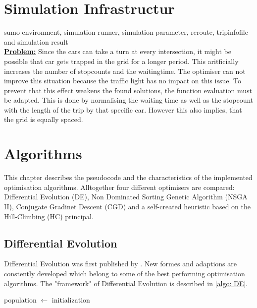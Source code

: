 \documentclass[./\jobname.tex]{subfiles}
\begin{document}
\newpage

\chapter{Simulation Infrastructur}
sumo environment, simulation runner, simulation parameter, reroute, tripinfofile and simulation result\\

\textbf{\underline{Problem:}} Since the cars can take a turn at every intersection, it might be possible that car gets trapped in the grid for a longer period. This aritficially increases the number of stopcounts and the waitingtime. The optimiser can not improve this situation because the traffic light has no impact on this issue. To prevent that this effect weakens the found solutions, the function evaluation must be adapted. This is done by normalising the waiting time as well as the stopcount with the length of the trip by that specific car. However this also implies, that the grid is equally spaced. 

\chapter{Algorithms}
This chapter describes the pseudocode and the characteristics of the implemented optimisation algorithms. Alltogether four different optimisers are compared: Differential Evolution (DE), Non Dominated Sorting Genetic Algorithm (NSGA II), Conjugate Gradinet Descent (CGD) and a self-created heuristic based on the Hill-Climbing (HC) principal. 

\section{Differential Evolution}

Differential Evolution was first published by \cite{storn_differential_1997}. New formes and adaptions are constently developed which belong to some of the best performing optimisation algorithms. The "framework" of Differential Evolution is described in \autoref{algo: DE}. 

\begin{algorithm}
	\SetAlgoNoLine
	\DontPrintSemicolon
	population $\gets$ initialization\;
	\label{algo: DE}
\end{algorithm}
\end{document}
